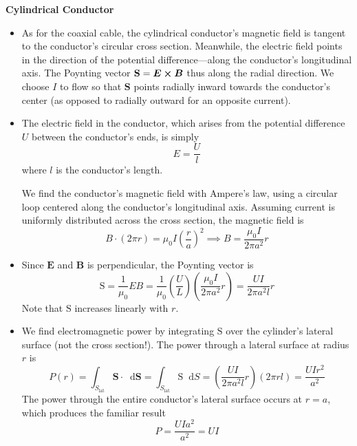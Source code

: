 \documentclass[11pt, a4paper]{article}
\newcommand{\diff}{\mathop{}\!\mathrm{d}} %
\renewcommand{\vec}[1]{\bm{#1}} %
\newcommand{\E}{\vec{E}}  %
\newcommand{\B}{\vec{B}}  %
\renewcommand{\S}{\mathbf{S}}  %
\renewcommand{\SS}{\mathrm{S}}  %
\newcommand{\mm}{\mu_{0}}  %
\newcommand{\m}{\vec{m}}  %
\newcommand{\Poy}{Poynting\xspace}
\begin{document}
\textbf{Cylindrical Conductor}
\begin{itemize}
	\item As for the coaxial cable, the cylindrical conductor's magnetic field is tangent to the conductor's circular cross section. Meanwhile, the electric field points in the direction of the potential difference---along the conductor's longitudinal axis. The \Poy vector $ \S = \E \cross \B $ thus along the radial direction. We choose $ I $ to flow so that $ \S $ points radially inward towards the conductor's center (as opposed to radially outward for an opposite current).
	
	\item The electric field in the conductor, which arises from the potential difference $ U $ between the conductor's ends, is simply
	\begin{equation*}
		E = \frac{U}{l}
	\end{equation*}
	where $ l $ is the conductor's length.
	
	We find the conductor's magnetic field with Ampere's law, using a circular loop centered along the conductor's longitudinal axis. Assuming current is uniformly distributed across the cross section, the magnetic field is
	\begin{equation*}
		B \cdot (2\pi r) = \mm I \left(\frac{r}{a}\right)^{2} \implies B =  \frac{\mm I}{2\pi a^{2}}r
	\end{equation*}
	
	\item Since $ \E $ and $ \B $ is perpendicular, the \Poy vector is
	\begin{equation*}
		\SS = \frac{1}{\mm}E B = \frac{1}{\mm} \left(\frac{U}{L}\right)\left( \frac{\mm I}{2\pi a^{2}}r\right) = \frac{UI}{2\pi a^{2}l}r
	\end{equation*}
	Note that $ \SS $ increases linearly with $ r $. 
	
	\item We find electromagnetic power by integrating $ \SS $ over the cylinder's lateral surface (not the cross section!). The power through a lateral surface at radius $ r $ is
	\begin{equation*}
		P(r) = \int_{S_{\text{lat}}} \S \cdot \diff \vec{S} = \int_{S_{\text{lat}}} \SS \diff S =  \left(\frac{UI}{2\pi a^{2}l}r\right) (2\pi r l) = \frac{UIr^{2}}{a^{2}}
	\end{equation*}
	The power through the entire conductor's lateral surface occurs at $ r = a $, which produces the familiar result
	\begin{equation*}
		P = \frac{UIa^{2}}{a^{2}} = UI
	\end{equation*}
	

\end{itemize}
\end{document}
